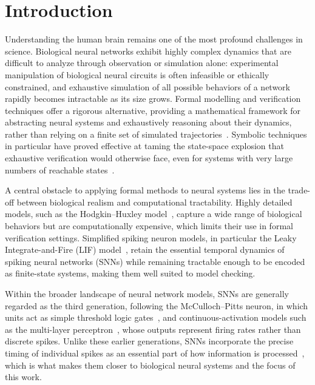 \documentclass[
]{ceurart}
\begin{document}
\section{Introduction}

Understanding the human brain remains one of the most profound challenges in
science. Biological neural networks exhibit highly complex dynamics that are
difficult to analyze through observation or simulation alone: experimental
manipulation of biological neural circuits is often infeasible or ethically
constrained, and exhaustive simulation of all possible behaviors of a network
rapidly becomes intractable as its size grows. Formal modelling and verification techniques offer a rigorous alternative,
providing a mathematical framework for abstracting neural systems and
exhaustively reasoning about their dynamics, rather than relying on a finite
set of simulated trajectories~\cite{Clarke1999}. Symbolic techniques in
particular have proved effective at taming the state-space explosion that
exhaustive verification would otherwise face, even for systems with very
large numbers of reachable states~\cite{Burch1994}.

A central obstacle to applying formal methods to neural systems lies in the
trade-off between biological realism and computational tractability. Highly
detailed models, such as the Hodgkin--Huxley model~\cite{Hodgkin1952},
capture a wide range of biological behaviors but are computationally
expensive, which limits their use in formal verification settings. Simplified
spiking neuron models, in particular the Leaky Integrate-and-Fire (LIF)
model~\cite{Lapicque1907,Gerstner2002}, retain the essential temporal
dynamics of spiking neural networks (SNNs) while remaining tractable enough
to be encoded as finite-state systems, making them well suited to model
checking.

Within the broader landscape of neural network models, SNNs are generally
regarded as the third generation, following the McCulloch--Pitts neuron, in
which units act as simple threshold logic gates~\cite{McCulloch1943}, and
continuous-activation models such as the multi-layer
perceptron~\cite{Cybenko1989}, whose outputs represent firing rates rather
than discrete spikes. Unlike these earlier generations, SNNs incorporate the
precise timing of individual spikes as an essential part of how information
is processed~\cite{Maass1997,PaugamMoisy2012}, which is what makes them
closer to biological neural systems and the focus of this work.
\end{document}
